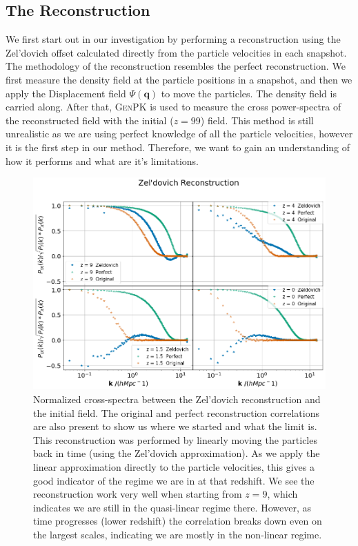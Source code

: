 \subsection{The Reconstruction}

We first start out in our investigation by performing a reconstruction using the Zel'dovich offset calculated directly from the particle velocities in each snapshot. The methodology of the reconstruction resembles the perfect reconstruction. We first measure the density field at the particle positions in a snapshot, and then we apply the Displacement field $\Psi(\textbf{q})$ to move the particles. The density field is carried along. After that, \textsc{GenPK} is used to measure the cross power-spectra of the reconstructed field with the initial ($z=99$) field. This method is still unrealistic as we are using perfect knowledge of all the particle velocities, however it is the first step in our method. Therefore, we want to gain an understanding of how it performs and what are it's limitations.

\begin{figure}
    \centering
    \includegraphics[width=1\columnwidth]{images/realRecon/zeld.png}%
    
    \caption{
    Normalized cross-spectra between the Zel'dovich reconstruction and the initial field. The original and perfect reconstruction correlations are also present to show us where we started and what the limit is. This reconstruction was performed by linearly moving the particles back in time (using the Zel'dovich approximation). As we apply the linear approximation directly to the particle velocities, this gives a good indicator of the regime we are in at that redshift. We see the reconstruction work very well when starting from $z=9$, which indicates we are still in the quasi-linear regime there. However, as time progresses (lower redshift) the correlation breaks down even on the largest scales, indicating we are mostly in the non-linear regime. 
    }
    
    \label{fig:4.1}
\end{figure}


